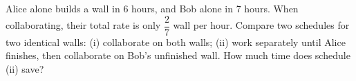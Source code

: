 Alice alone builds a wall in 6 hours, and Bob alone in 7 hours. When collaborating, their total rate is only $\dfrac{2}{7}$ wall per hour. Compare two schedules for two identical walls: (i) collaborate on both walls; (ii) work separately until Alice finishes, then collaborate on Bob's unfinished wall. How much time does schedule (ii) save?
